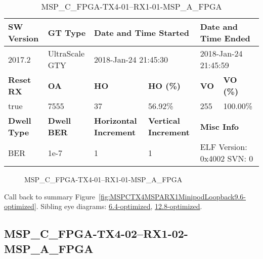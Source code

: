 \begin{table}[h]
\centering
\caption{MSP\_C\_FPGA-TX4-01--RX1-01-MSP\_A\_FPGA}
\label{tab:MSPCFPGATX401RX101MSPAFPGA9.6-optimized}
\begin{tabular}{@{}|l|l|l|l|l|l|@{}}
\toprule
\textbf{SW Version}                & \textbf{GT Type}   & \multicolumn{2}{l|}{\textbf{Date and Time Started}}            & \multicolumn{2}{l|}{\textbf{Date and Time Ended}}        \\ \midrule
2017.2                       & UltraScale GTY          & \multicolumn{2}{l|}{2018-Jan-24 21:45:30}                   & \multicolumn{2}{l|}{2018-Jan-24 21:45:59}               \\ \midrule
\textbf{Reset RX}                  & \textbf{OA} & \textbf{HO}   & \textbf{HO (\%)} & \textbf{VO} & \textbf{VO (\%)} \\ \midrule
true & 7555        & 37          & 56.92\%        & 255        & 100.00\%       \\ \midrule
\textbf{Dwell Type}                & \textbf{Dwell BER} & \textbf{Horizontal Increment} & \textbf{Vertical Increment}    & \multicolumn{2}{l|}{\textbf{Misc Info}}                  \\ \midrule
BER                            & 1e-7        & 1        & 1           & \multicolumn{2}{l|}{ELF Version: 0x4002 SVN: 0}                         \\ \bottomrule
\end{tabular}
\end{table}

\begin{figure}[h]
\caption{MSP\_C\_FPGA-TX4-01--RX1-01-MSP\_A\_FPGA} \label{fig:MSPCFPGATX401RX101MSPAFPGA9.6-optimized}
\end{figure}

Call back to summary Figure~\ref{fig:MSPCTX4MSPARX1MinipodLoopback9.6-optimized}.
Sibling eye diagrams: \hyperref[sec:MSPCFPGATX401RX101MSPAFPGA6.4-optimized]{6.4-optimized}, \hyperref[sec:MSPCFPGATX401RX101MSPAFPGA12.8-optimized]{12.8-optimized}.

\clearpage
\newpage


\subsection{MSP\_C\_FPGA-TX4-02--RX1-02-MSP\_A\_FPGA}\label{sec:MSPCFPGATX402RX102MSPAFPGA9.6-optimized}

